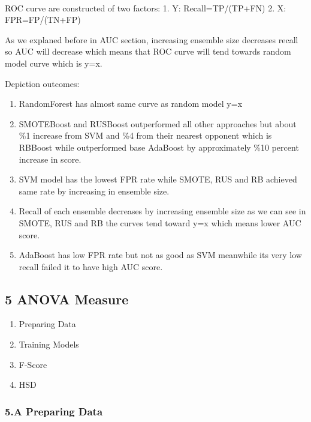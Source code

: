 \documentclass[11pt]{article}
\providecommand{\tightlist}{%
      \setlength{\itemsep}{0pt}\setlength{\parskip}{0pt}}
\begin{document}
    \begin{center}
    \end{center}
    { \hspace*{\fill} \\}
    
    ROC curve are constructed of two factors: 1. Y: Recall=TP/(TP+FN) 2. X:
FPR=FP/(TN+FP)

As we explaned before in AUC section, increasing ensemble size decreases
recall so AUC will decrease which means that ROC curve will tend towards
random model curve which is y=x.

Depiction outcomes:

\begin{enumerate}
\def\labelenumi{\arabic{enumi}.}
\tightlist
\item
  RandomForest has almost same curve as random model y=x
\item
  SMOTEBoost and RUSBoost outperformed all other approaches but about
  \%1 increase from SVM and \%4 from their nearest opponent which is
  RBBoost while outperformed base AdaBoost by approximately \%10 percent
  increase in score.
\item
  SVM model has the lowest FPR rate while SMOTE, RUS and RB achieved
  same rate by increasing in ensemble size.
\item
  Recall of each ensemble decreases by increasing ensemble size as we
  can see in SMOTE, RUS and RB the curves tend toward y=x which means
  lower AUC score.
\item
  AdaBoost has low FPR rate but not as good as SVM meanwhile its very
  low recall failed it to have high AUC score.
\end{enumerate}

    \hypertarget{anova-measure}{%
\subsection{5 ANOVA Measure}\label{anova-measure}}

\begin{enumerate}
\def\labelenumi{\arabic{enumi}.}
\tightlist
\item
  Preparing Data
\item
  Training Models
\item
  F-Score
\item
  HSD
\end{enumerate}

    \hypertarget{a-preparing-data}{%
\subsubsection{5.A Preparing Data}\label{a-preparing-data}}
\end{document}
